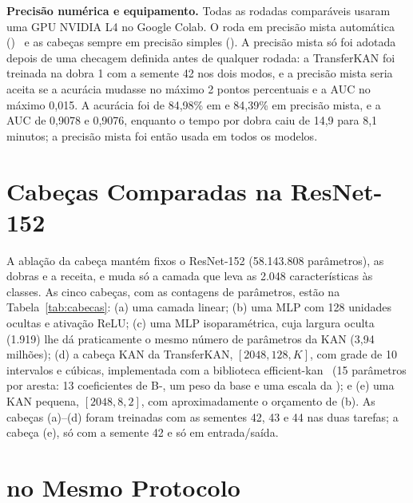 \textbf{Precisão numérica e equipamento.} Todas as rodadas comparáveis usaram uma GPU NVIDIA L4 no Google Colab. O  roda em precisão mista automática ()~\cite{micikevicius2018mixed} e as cabeças sempre em precisão simples (). A precisão mista só foi adotada depois de uma checagem definida antes de qualquer rodada: a TransferKAN foi treinada na dobra 1 com a semente 42 nos dois modos, e a precisão mista seria aceita se a acurácia mudasse no máximo 2 pontos percentuais e a AUC no máximo 0,015. A acurácia foi de 84,98\% em  e 84,39\% em precisão mista, e a AUC de 0,9078 e 0,9076, enquanto o tempo por dobra caiu de 14,9 para 8,1 minutos; a precisão mista foi então usada em todos os modelos.

\section{Cabeças Comparadas na ResNet-152}
\label{sec:heads_setup}

A ablação da cabeça mantém fixos o  ResNet-152 (58.143.808 parâmetros), as dobras e a receita, e muda só a camada que leva as 2.048 características às classes. As cinco cabeças, com as contagens de parâmetros, estão na Tabela~\ref{tab:cabecas}:
(a) uma camada linear; (b) uma MLP com 128 unidades ocultas e ativação \gls{ReLU}; (c) uma MLP isoparamétrica, cuja largura oculta (1.919) lhe dá praticamente o mesmo número de parâmetros da KAN (3,94 milhões); (d) a cabeça KAN da TransferKAN, $[2048, 128, K]$, com grade de 10 intervalos e  cúbicas, implementada com a biblioteca efficient-kan~\cite{efficientkan} (15 parâmetros por aresta: 13 coeficientes de B-, um peso da base e uma escala da ); e (e) uma KAN pequena, $[2048, 8, 2]$, com aproximadamente o orçamento de (b). As cabeças (a)--(d) foram treinadas com as sementes 42, 43 e 44 nas duas tarefas; a cabeça (e), só com a semente 42 e só em entrada/saída.

\section{\texorpdfstring{}{Backbones} no Mesmo Protocolo}
\label{sec:backbones_setup}

